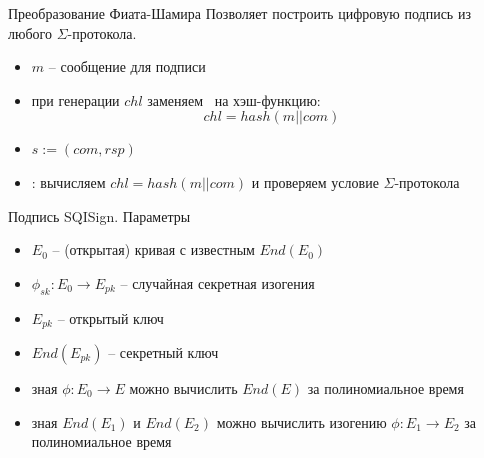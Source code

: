 \documentclass{beamer}
\begin{document}
\begin{frame}{Преобразование Фиата-Шамира}
Позволяет построить цифровую подпись из любого $\Sigma$-протокола.
\vspace{1em}

\begin{itemize}
	\item $m$ -- сообщение для подписи
	\item при генерации $chl$ заменяем \UserB~на хэш-функцию:
	\[
	chl = hash(m || com)
	\]
	\item {} $s := (com, rsp)$
	\item {}: вычисляем $chl = hash(m || com)$ и проверяем условие $\Sigma$-протокола
\end{itemize}

\end{frame}


\begin{frame}{Подпись SQISign. Параметры}
	\begin{itemize}
		\item $E_0$ -- (открытая) кривая с известным $End(E_0)$
		\item $\phi_{sk}: E_0 \rightarrow E_{pk}$ -- случайная секретная изогения
		\item $E_{pk}$ -- открытый ключ
		\item $End(E_{pk})$ -- секретный ключ
	\end{itemize}
	
	\vspace{1em}
	\begin{itemize}
		\item зная $\phi: E_0 \rightarrow E$ можно вычислить $End(E)$ за полиномиальное время
		\item зная $End(E_1)$ и $End(E_2)$ можно вычислить изогению $\phi: E_1 \rightarrow E_2$ за полиномиальное время
	\end{itemize}
\end{frame}
\end{document}
